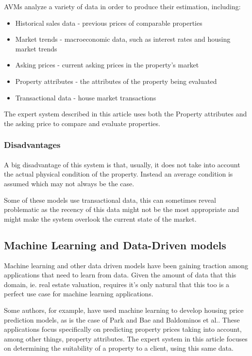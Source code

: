 \documentclass[runningheads]{llncs}
\begin{document}
AVMs analyze a variety of data in order to produce their estimation, including:
\begin{itemize}
    \item Historical sales data - previous prices of comparable properties
    \item Market trends - macroeconomic data, such as interest rates and housing market trends
    \item Asking prices - current asking prices in the property's market
    \item Property attributes - the attributes of the property being evaluated
    \item Transactional data - house market transactions
\end{itemize}

The expert system described in this article uses both the Property attributes and the asking price to compare and evaluate properties.

\subsubsection{Disadvantages}
\paragraph{}
A big disadvantage of this system is that, usually, it does not take into account the actual physical condition of the property. Instead an average condition is assumed which may not always be the case.

Some of these models use transactional data, this can sometimes reveal problematic as the recency of this data might not be the most appropriate and might make the system overlook the current state of the market.

\subsection{Machine Learning and Data-Driven models}

Machine learning and other data driven models have been gaining traction among applications that need to learn from data.
Given the amount of data that this domain, ie. real estate valuation, requires it's only natural that this too is a perfect use case for machine learning applications.

Some authors, for example, have used machine learning to develop housing price prediction models, as is the case of Park and Bae\cite{bpark} and Baldominos et al.\cite{mlinrealestate}. These applications focus specifically on predicting property prices taking into account, among other things, property attributes. The expert system in this article focuses on determining the suitability of a property to a client, using this same data.
\end{document}
